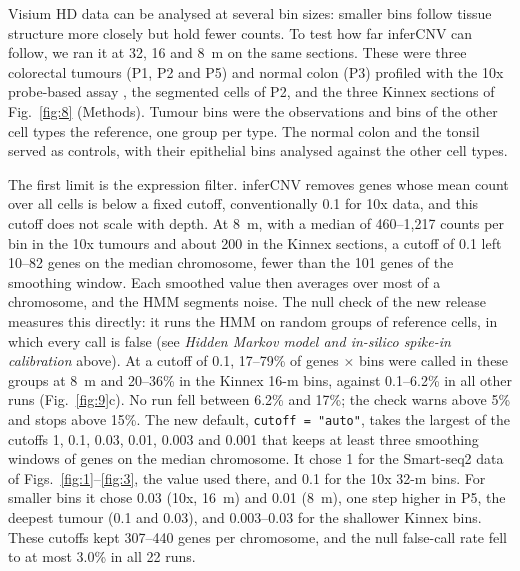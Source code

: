 Visium HD data can be analysed at several bin sizes: smaller bins follow tissue structure more closely but hold fewer counts. To test how far inferCNV can follow, we ran it at 32, 16 and 8~\textmu m on the same sections. These were three colorectal tumours (P1, P2 and P5) and normal colon (P3) profiled with the 10x probe-based assay \citep{oliveira2025visiumhd}, the segmented cells of P2, and the three Kinnex sections of Fig.~\ref{fig:8} (Methods). Tumour bins were the observations and bins of the other cell types the reference, one group per type. The normal colon and the tonsil served as controls, with their epithelial bins analysed against the other cell types.

The first limit is the expression filter. inferCNV removes genes whose mean count over all cells is below a fixed cutoff, conventionally 0.1 for 10x data, and this cutoff does not scale with depth. At 8~\textmu m, with a median of 460--1,217 counts per bin in the 10x tumours and about 200 in the Kinnex sections, a cutoff of 0.1 left 10--82 genes on the median chromosome, fewer than the 101 genes of the smoothing window. Each smoothed value then averages over most of a chromosome, and the HMM segments noise. The null check of the new release measures this directly: it runs the HMM on random groups of reference cells, in which every call is false (see \emph{Hidden Markov model and in-silico spike-in calibration} above). At a cutoff of 0.1, 17--79\% of genes $\times$ bins were called in these groups at 8~\textmu m and 20--36\% in the Kinnex 16-\textmu m bins, against 0.1--6.2\% in all other runs (Fig.~\ref{fig:9}c). No run fell between 6.2\% and 17\%; the check warns above 5\% and stops above 15\%. The new default, \texttt{cutoff\ =\ "auto"}, takes the largest of the cutoffs 1, 0.1, 0.03, 0.01, 0.003 and 0.001 that keeps at least three smoothing windows of genes on the median chromosome. It chose 1 for the Smart-seq2 data of Figs.~\ref{fig:1}--\ref{fig:3}, the value used there, and 0.1 for the 10x 32-\textmu m bins. For smaller bins it chose 0.03 (10x, 16~\textmu m) and 0.01 (8~\textmu m), one step higher in P5, the deepest tumour (0.1 and 0.03), and 0.003--0.03 for the shallower Kinnex bins. These cutoffs kept 307--440 genes per chromosome, and the null false-call rate fell to at most 3.0\% in all 22 runs.

